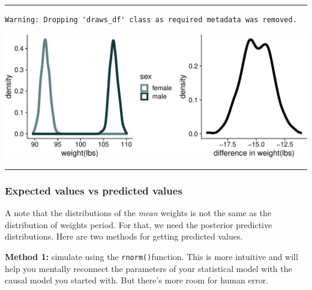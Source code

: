 \documentclass[
  letterpaper,
  DIV=11,
  numbers=noendperiod]{scrartcl}
\newenvironment{Shaded}{\begin{snugshade}}{\end{snugshade}}
\newcommand{\AttributeTok}[1]{\textcolor[rgb]{0.40,0.45,0.13}{#1}}
\newcommand{\FunctionTok}[1]{\textcolor[rgb]{0.28,0.35,0.67}{#1}}
\newcommand{\NormalTok}[1]{\textcolor[rgb]{0.00,0.23,0.31}{#1}}
\newcommand{\OtherTok}[1]{\textcolor[rgb]{0.00,0.23,0.31}{#1}}
\newcommand{\SpecialCharTok}[1]{\textcolor[rgb]{0.37,0.37,0.37}{#1}}
\begin{document}
\begin{center}\rule{0.5\linewidth}{0.5pt}\end{center}

\begin{verbatim}
Warning: Dropping 'draws_df' class as required metadata was removed.
\end{verbatim}

\begin{center}
\includegraphics[width=25in,height=\textheight]{lecture02-2_files/figure-pdf/unnamed-chunk-7-1.pdf}
\end{center}

\begin{center}\rule{0.5\linewidth}{0.5pt}\end{center}

\subsubsection{Expected values vs predicted
values}\label{expected-values-vs-predicted-values}

A note that the distributions of the \emph{mean} weights is not the same
as the distribution of weights period. For that, we need the posterior
predictive distributions. Here are two methods for getting predicted
values.

\textbf{Method 1:} simulate using the \texttt{rnorm()}function. This is
more intuitive and will help you mentally reconnect the parameters of
your statistical model with the causal model you started with. But
there's more room for human error.

\begin{Shaded}
\end{Shaded}
\end{document}
